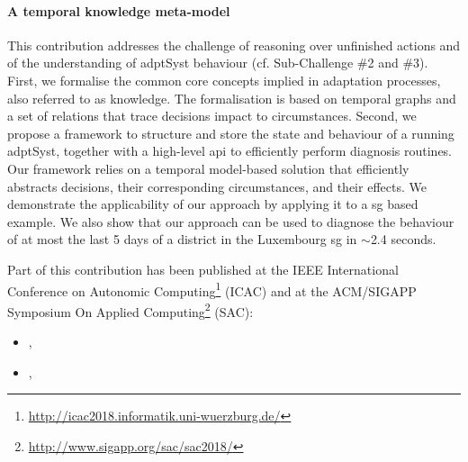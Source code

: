 \paragraph{A temporal knowledge meta-model}
This contribution addresses the challenge of reasoning over unfinished actions and of the understanding of \gls{adptSyst} \gls{behaviour} (cf. Sub-Challenge \#2 and \#3).
First, we formalise the common core concepts implied in adaptation processes, also referred to as \gls{knowledge}.
The formalisation is based on temporal graphs and a set of relations that trace decisions impact to circumstances.
Second, we propose a framework to structure and store the state and behaviour of a running \gls{adptSyst}, together with a high-level \gls{api} to efficiently perform diagnosis routines.
Our framework relies on a temporal model-based solution that efficiently abstracts decisions, their corresponding circumstances, and their effects.
We demonstrate the applicability of our approach by applying it to a \gls{sg} based example.
We also show that our approach can be used to diagnose the behaviour of at most the last 5 days of a district in the Luxembourg \gls{sg} in $\sim$2.4 seconds.


Part of this contribution has been published at the IEEE International Conference on Autonomic Computing\footnote{\url{http://icac2018.informatik.uni-wuerzburg.de/}} (ICAC) and at the ACM/SIGAPP Symposium On Applied Computing\footnote{\url{http://www.sigapp.org/sac/sac2018/}} (SAC):
\begin{itemize}
	\item {}, \citeauthor{DBLP:conf/sac/MoulineB0FBMB18}
	\item {}, \citeauthor{DBLP:conf/icac/MoulineBFBB18}
\end{itemize}